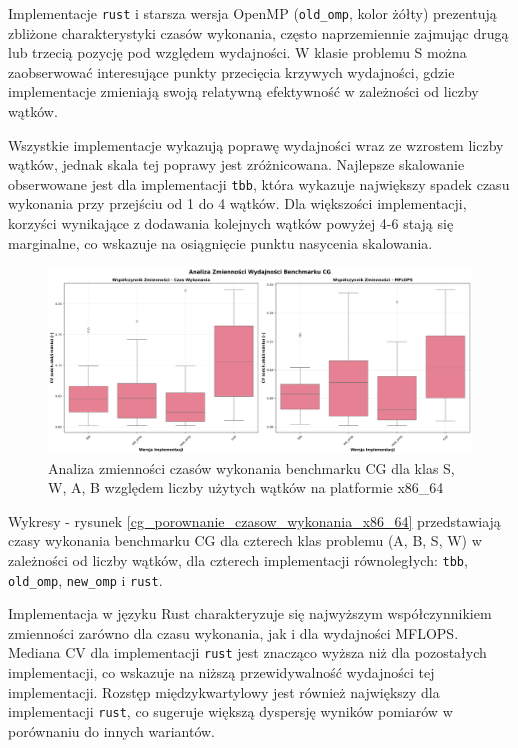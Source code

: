 Implementacje \texttt{rust} i starsza wersja OpenMP (\texttt{old\_omp}, kolor żółty) prezentują zbliżone charakterystyki czasów wykonania, często naprzemiennie zajmując drugą lub trzecią pozycję pod względem wydajności. W klasie problemu S można zaobserwować interesujące punkty przecięcia krzywych wydajności, gdzie implementacje zmieniają swoją relatywną efektywność w zależności od liczby wątków.

Wszystkie implementacje wykazują poprawę wydajności wraz ze wzrostem liczby wątków, jednak skala tej poprawy jest zróżnicowana. Najlepsze skalowanie obserwowane jest dla implementacji \texttt{tbb}, która wykazuje największy spadek czasu wykonania przy przejściu od 1 do 4 wątków. Dla większości implementacji, korzyści wynikające z dodawania kolejnych wątków powyżej 4-6 stają się marginalne, co wskazuje na osiągnięcie punktu nasycenia skalowania.

\begin{figure}[H]
    \centering
    \includegraphics[width=\textwidth]{analiza/images/parallel/cg/x86/cg_analiza_zmiennosci.png}
    \caption{Analiza zmienności czasów wykonania benchmarku CG dla klas S, W, A, B względem liczby użytych wątków na platformie x86\_64}
    \label{cg_analiza_zmiennosci_x86_64}
\end{figure}
Wykresy - rysunek \ref{cg_porownanie_czasow_wykonania_x86_64} przedstawiają czasy wykonania benchmarku CG dla czterech klas problemu (A, B, S, W) w zależności od liczby wątków, dla czterech implementacji równoległych: \texttt{tbb}, \texttt{old\_omp}, \texttt{new\_omp} i \texttt{rust}.

Implementacja w języku Rust charakteryzuje się najwyższym współczynnikiem zmienności zarówno dla czasu wykonania, jak i dla wydajności MFLOPS. Mediana CV dla implementacji \texttt{rust} jest znacząco wyższa niż dla pozostałych implementacji, co wskazuje na niższą przewidywalność wydajności tej implementacji. Rozstęp międzykwartylowy jest również największy dla implementacji \texttt{rust}, co sugeruje większą dyspersję wyników pomiarów w porównaniu do innych wariantów.

